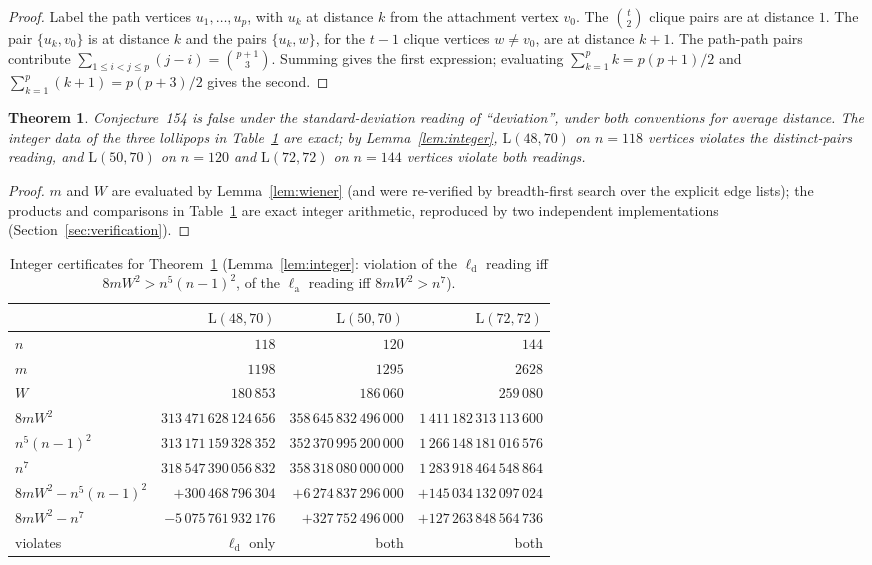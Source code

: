 \documentclass[11pt]{article}
\newtheorem{theorem}{Theorem}[section]
\theoremstyle{remark}
\newcommand{\la}{\ell_{\mathrm{a}}}
\newcommand{\ld}{\ell_{\mathrm{d}}}
\newcommand{\Lol}{\mathrm{L}}
\begin{document}
\begin{proof}
Label the path vertices $u_1, \dots, u_p$, with $u_k$ at distance $k$ from
the attachment vertex $v_0$. The $\binom{t}{2}$ clique pairs are at distance
$1$. The pair $\{u_k, v_0\}$ is at distance $k$ and the pairs $\{u_k, w\}$,
for the $t-1$ clique vertices $w \neq v_0$, are at distance $k+1$. The
path-path pairs contribute $\sum_{1 \le i < j \le p} (j - i) =
\binom{p+1}{3}$. Summing gives the first expression; evaluating
$\sum_{k=1}^p k = p(p+1)/2$ and $\sum_{k=1}^p (k+1) = p(p+3)/2$ gives the
second.
\end{proof}

\begin{theorem}\label{thm:154}
Conjecture~154 is false under the standard-deviation reading of
``deviation'', under both conventions for average distance. The integer data
of the three lollipops in Table~\ref{tab:154} are exact;
by Lemma~\ref{lem:integer}, $\Lol(48,70)$ on $n = 118$ vertices violates the
distinct-pairs reading, and $\Lol(50,70)$ on $n = 120$ and $\Lol(72,72)$ on
$n = 144$ vertices violate both readings.
\end{theorem}

\begin{proof}
$m$ and $W$ are evaluated by Lemma~\ref{lem:wiener} (and were re-verified by
breadth-first search over the explicit edge lists); the products and
comparisons in Table~\ref{tab:154} are exact integer arithmetic, reproduced
by two independent implementations (Section~\ref{sec:verification}).
\end{proof}

\begin{table}[ht]
\centering\small
\begin{tabular}{@{}lrrr@{}}
\toprule
 & $\Lol(48,70)$ & $\Lol(50,70)$ & $\Lol(72,72)$ \\
\midrule
$n$ & $118$ & $120$ & $144$ \\
$m$ & $1198$ & $1295$ & $2628$ \\
$W$ & $180\,853$ & $186\,060$ & $259\,080$ \\
$8mW^2$        & $313\,471\,628\,124\,656$ & $358\,645\,832\,496\,000$ & $1\,411\,182\,313\,113\,600$ \\
$n^5(n-1)^2$   & $313\,171\,159\,328\,352$ & $352\,370\,995\,200\,000$ & $1\,266\,148\,181\,016\,576$ \\
$n^7$          & $318\,547\,390\,056\,832$ & $358\,318\,080\,000\,000$ & $1\,283\,918\,464\,548\,864$ \\
$8mW^2 - n^5(n-1)^2$ & $+300\,468\,796\,304$ & $+6\,274\,837\,296\,000$ & $+145\,034\,132\,097\,024$ \\
$8mW^2 - n^7$        & $-5\,075\,761\,932\,176$ & $+327\,752\,496\,000$ & $+127\,263\,848\,564\,736$ \\
violates       & $\ld$ only & both & both \\
\bottomrule
\end{tabular}
\caption{Integer certificates for Theorem~\ref{thm:154}
(Lemma~\ref{lem:integer}: violation of the $\ld$ reading iff
$8mW^2 > n^5(n-1)^2$, of the $\la$ reading iff $8mW^2 > n^7$).}
\label{tab:154}
\end{table}
\end{document}
